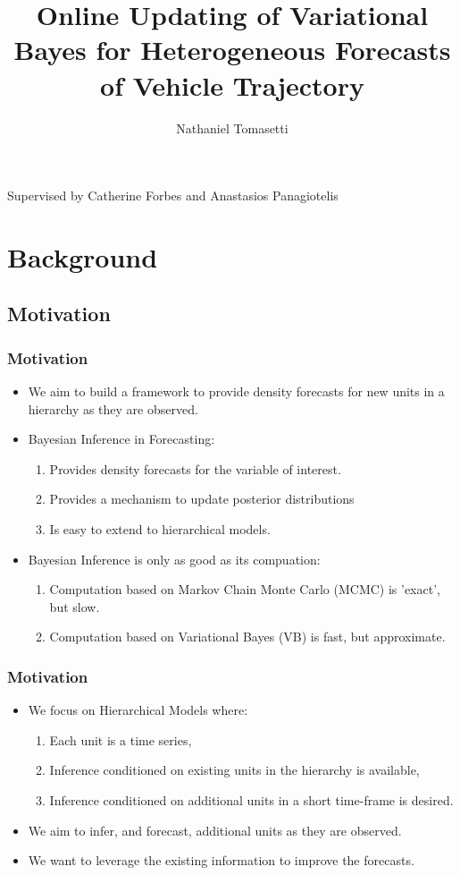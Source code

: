 \documentclass[11pt]{beamer}\usepackage[]{graphicx}\usepackage[]{color}
\title[Online Updating of Variational Bayes]{Online Updating of Variational Bayes for Heterogeneous Forecasts of Vehicle Trajectory}
\author[Nathaniel Tomasetti]{Nathaniel Tomasetti}
\date{ }
\begin{document}
\begin{frame}
\titlepage
\centering
Supervised by Catherine Forbes and Anastasios Panagiotelis
\end{frame}


\begin{frame}
\tableofcontents
\end{frame}

\section{Background}
\subsection{Motivation}

\begin{frame}
\frametitle{Motivation}
\begin{itemize}
\item We aim to build a framework to provide density forecasts for new units in a hierarchy as they are observed.
\pause
\item Bayesian Inference in Forecasting:
\begin{enumerate}
\item Provides density forecasts for the variable of interest.
\item Provides a mechanism to update posterior distributions
\item Is easy to extend to hierarchical models.
\end{enumerate}
\pause
\vspace{3mm}
\item Bayesian Inference is only as good as its compuation:
\begin{enumerate}
\item Computation based on Markov Chain Monte Carlo (MCMC) is 'exact', but slow.
\item Computation based on Variational Bayes (VB) is fast, but approximate.
\end{enumerate}
\end{itemize}
\end{frame}

\begin{frame}
\frametitle{Motivation}
\begin{itemize}
\item We focus on Hierarchical Models where:
\begin{enumerate}
\item Each unit is a time series,
\item Inference conditioned on existing units in the hierarchy is available,
\item Inference conditioned on additional units in a short time-frame is desired.
\end{enumerate}
\vspace{3mm}
\pause
\item We aim to infer, and forecast, additional units as they are observed.
\pause
\item We want to leverage the existing information to improve the forecasts.
\end{itemize}
\end{frame}
\end{document}
